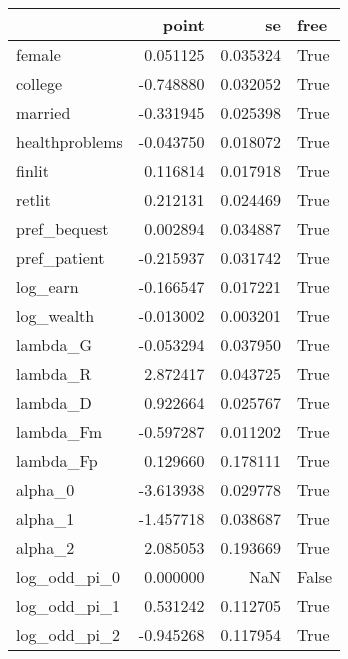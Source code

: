 \begin{tabular}{lrrl}
\toprule
{} &     point &        se &   free \\
\midrule
female         &  0.051125 &  0.035324 &   True \\
college        & -0.748880 &  0.032052 &   True \\
married        & -0.331945 &  0.025398 &   True \\
healthproblems & -0.043750 &  0.018072 &   True \\
finlit         &  0.116814 &  0.017918 &   True \\
retlit         &  0.212131 &  0.024469 &   True \\
pref\_bequest   &  0.002894 &  0.034887 &   True \\
pref\_patient   & -0.215937 &  0.031742 &   True \\
log\_earn       & -0.166547 &  0.017221 &   True \\
log\_wealth     & -0.013002 &  0.003201 &   True \\
lambda\_G       & -0.053294 &  0.037950 &   True \\
lambda\_R       &  2.872417 &  0.043725 &   True \\
lambda\_D       &  0.922664 &  0.025767 &   True \\
lambda\_Fm      & -0.597287 &  0.011202 &   True \\
lambda\_Fp      &  0.129660 &  0.178111 &   True \\
alpha\_0        & -3.613938 &  0.029778 &   True \\
alpha\_1        & -1.457718 &  0.038687 &   True \\
alpha\_2        &  2.085053 &  0.193669 &   True \\
log\_odd\_pi\_0   &  0.000000 &       NaN &  False \\
log\_odd\_pi\_1   &  0.531242 &  0.112705 &   True \\
log\_odd\_pi\_2   & -0.945268 &  0.117954 &   True \\
\bottomrule
\end{tabular}
